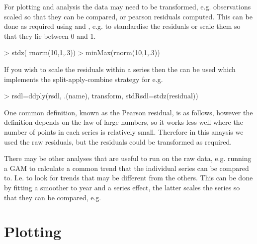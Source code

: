 \documentclass[shortnames,nojss,article]{jss}
\begin{document}
For plotting and analysis the data may need to be transformed, e.g. observations scaled so that
they can be compared, or pearson residuals computed. This can be done as required using 
and , e.g. to standardise the residuals or scale them so that they lie between 0 and 1.

\begin{Schunk}
\begin{Sinput}
> stdz(  rnorm(10,1,.3))
> minMax(rnorm(10,1,.3))
\end{Sinput}
\end{Schunk}

If you wish to scale the residuals within a series then the  can be used which implements the split-apply-combine strategy for  e.g.

\begin{Schunk}
\begin{Sinput}
> rsdl=ddply(rsdl, .(name), transform, stdRsdl=stdz(residual))
\end{Sinput}
\end{Schunk}

One common definition, known as the Pearson residual, is as follows, however the definition depends on the law of large numbers, so it works less well where the number of points in each series is relatively small. Therefore in this anaysis we used the raw residuals, but the residuals could be transformed as required.
 
There may be other analyses that are useful to run on the raw data, e.g. running a GAM to calculate a common trend that the individual series can be compared to. I.e. to look for trends that may be different from the others. This can be done by fitting a smoother to year and a series effect, the latter scales the series so that they can be compared, e.g.

\begin{Schunk}
\end{Schunk}

\section{Plotting}
\end{document}
